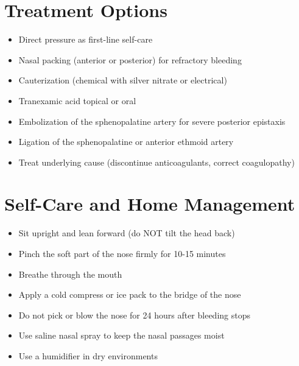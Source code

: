 \section*{Treatment Options}
\begin{itemize}
\item Direct pressure as first-line self-care
\item Nasal packing (anterior or posterior) for refractory bleeding
\item Cauterization (chemical with silver nitrate or electrical)
\item Tranexamic acid topical or oral
\item Embolization of the sphenopalatine artery for severe posterior epistaxis
\item Ligation of the sphenopalatine or anterior ethmoid artery
\item Treat underlying cause (discontinue anticoagulants, correct coagulopathy)
\end{itemize}

\section*{Self-Care and Home Management}
\begin{itemize}
\item Sit upright and lean forward (do NOT tilt the head back)
\item Pinch the soft part of the nose firmly for 10-15 minutes
\item Breathe through the mouth
\item Apply a cold compress or ice pack to the bridge of the nose
\item Do not pick or blow the nose for 24 hours after bleeding stops
\item Use saline nasal spray to keep the nasal passages moist
\item Use a humidifier in dry environments
\end{itemize}

